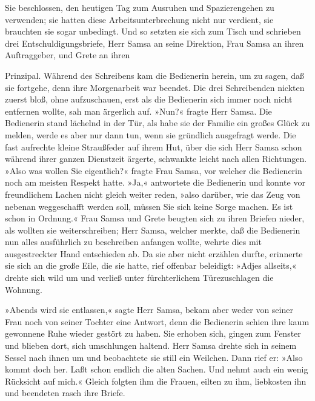 Sie beschlossen, den heutigen Tag zum Ausruhen und Spazierengehen zu
verwenden; sie hatten diese Arbeitsunterbrechung nicht nur verdient, sie
brauchten sie sogar unbedingt. Und so setzten sie sich zum Tisch und
schrieben drei Entschuldigungsbriefe, Herr Samsa an seine Direktion,
Frau Samsa an ihren Auftraggeber, und Grete an ihren \linebreak

\quebra

\noindent{}Prinzipal. Während
des Schreibens kam die Bedienerin herein, um zu sagen, daß sie fortgehe,
denn ihre Morgenarbeit war beendet. Die drei Schreibenden nickten zuerst
bloß, ohne aufzuschauen, erst als die Bedienerin sich immer noch nicht
entfernen wollte, sah man ärgerlich auf. »Nun?« fragte Herr Samsa. Die
Bedienerin stand lächelnd in der Tür, als habe sie der Familie ein
großes Glück zu melden, werde es aber nur dann tun, wenn sie gründlich
ausgefragt werde. Die fast aufrechte kleine Straußfeder auf ihrem Hut,
über die sich Herr Samsa schon während ihrer ganzen Dienstzeit ärgerte,
schwankte leicht nach allen Richtungen. »Also was wollen Sie
eigentlich?« fragte Frau Samsa, vor welcher die Bedienerin noch am
meisten Respekt hatte. »Ja,« antwortete die Bedienerin und konnte vor
freundlichem Lachen nicht gleich weiter reden, »also darüber, wie das
Zeug von nebenan weggeschafft werden soll, müssen Sie sich keine Sorge
machen. Es ist schon in Ordnung.« Frau Samsa und Grete beugten sich zu
ihren Briefen nieder, als wollten sie weiterschreiben; Herr Samsa,
welcher merkte, daß die Bedienerin nun alles ausführlich zu beschreiben
anfangen wollte, wehrte dies mit ausgestreckter Hand entschieden ab. Da
sie aber nicht erzählen durfte, erinnerte sie sich an die große Eile,
die sie hatte, rief offenbar beleidigt: »Adjes allseits,« drehte sich
wild um und verließ unter fürchterlichem Türezuschlagen die Wohnung.

»Abends wird sie entlassen,« sagte Herr Samsa, bekam aber weder von
seiner Frau noch von seiner Tochter eine Antwort, denn die Bedienerin
schien ihre kaum gewonnene Ruhe wieder gestört zu haben. Sie erhoben
sich, gingen zum Fenster und blieben dort, sich umschlungen haltend.
Herr Samsa drehte sich in seinem Sessel nach ihnen um und beobachtete
sie still ein Weilchen. Dann rief er: »Also kommt doch her. Laßt schon
endlich die alten Sachen. Und nehmt auch ein wenig Rücksicht auf mich.«
Gleich folgten ihm die Frauen, eilten zu ihm, liebkosten ihn und
beendeten rasch ihre Briefe.

